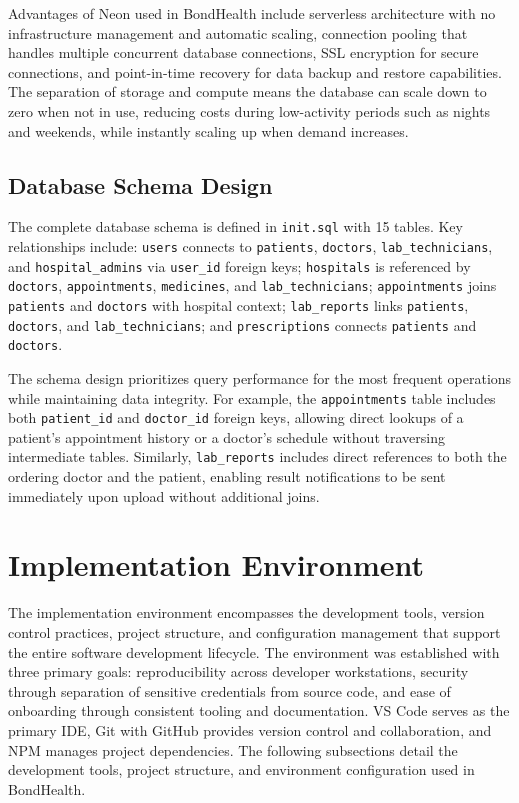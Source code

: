 \justifying
\noindent Advantages of Neon used in BondHealth include serverless architecture with no infrastructure management and automatic scaling, connection pooling that handles multiple concurrent database connections, SSL encryption for secure connections, and point-in-time recovery for data backup and restore capabilities. The separation of storage and compute means the database can scale down to zero when not in use, reducing costs during low-activity periods such as nights and weekends, while instantly scaling up when demand increases.

\subsection{Database Schema Design}

\justifying
\noindent The complete database schema is defined in \texttt{init.sql} with 15 tables. Key relationships include: \texttt{users} connects to \texttt{patients}, \texttt{doctors}, \texttt{lab\_technicians}, and \texttt{hospital\_admins} via \texttt{user\_id} foreign keys; \texttt{hospitals} is referenced by \texttt{doctors}, \texttt{appointments}, \texttt{medicines}, and \texttt{lab\_technicians}; \texttt{appointments} joins \texttt{patients} and \texttt{doctors} with hospital context; \texttt{lab\_reports} links \texttt{patients}, \texttt{doctors}, and \texttt{lab\_technicians}; and \texttt{prescriptions} connects \texttt{patients} and \texttt{doctors}.

\justifying
\noindent The schema design prioritizes query performance for the most frequent operations while maintaining data integrity. For example, the \texttt{appointments} table includes both \texttt{patient\_id} and \texttt{doctor\_id} foreign keys, allowing direct lookups of a patient's appointment history or a doctor's schedule without traversing intermediate tables. Similarly, \texttt{lab\_reports} includes direct references to both the ordering doctor and the patient, enabling result notifications to be sent immediately upon upload without additional joins.

\section{Implementation Environment}
\justifying
\noindent The implementation environment encompasses the development tools, version control practices, project structure, and configuration management that support the entire software development lifecycle. The environment was established with three primary goals: reproducibility across developer workstations, security through separation of sensitive credentials from source code, and ease of onboarding through consistent tooling and documentation. VS Code serves as the primary IDE, Git with GitHub provides version control and collaboration, and NPM manages project dependencies. The following subsections detail the development tools, project structure, and environment configuration used in BondHealth.

